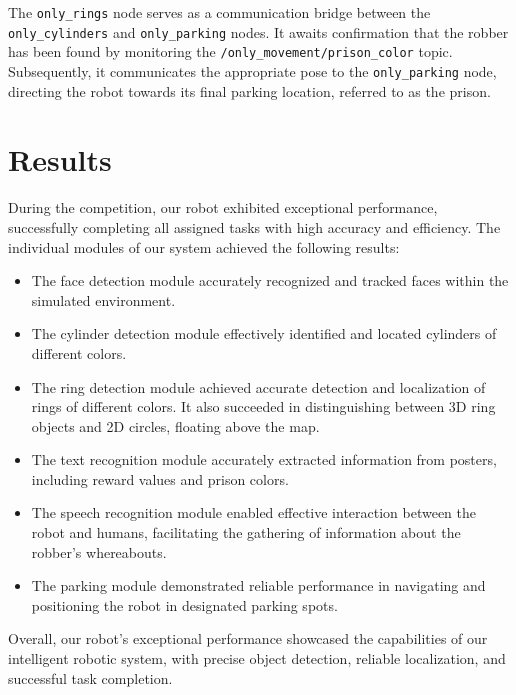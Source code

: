 \documentclass{article}
\begin{document}
The \texttt{only\_rings} node serves as a communication bridge between the \texttt{only\_cylinders} and \texttt{only\_parking} nodes. It awaits confirmation that the robber has been found by monitoring the \texttt{/only\_movement/prison\_color} topic. Subsequently, it communicates the appropriate pose to the \texttt{only\_parking} node, directing the robot towards its final parking location, referred to as the prison.

\section{Results}

During the competition, our robot exhibited exceptional performance, successfully completing all assigned tasks with high accuracy and efficiency. The individual modules of our system achieved the following results:
\begin{itemize}
  \item The face detection module accurately recognized and tracked faces within the simulated environment.
  \item The cylinder detection module effectively identified and located cylinders of different colors.
  \item The ring detection module achieved accurate detection and localization of rings of different colors. It also succeeded in distinguishing between 3D ring objects and 2D circles, floating above the map.
  \item The text recognition module accurately extracted information from posters, including reward values and prison colors.
  \item The speech recognition module enabled effective interaction between the robot and humans, facilitating the gathering of information about the robber's whereabouts.
  \item The parking module demonstrated reliable performance in navigating and positioning the robot in designated parking spots.
\end{itemize}
Overall, our robot's exceptional performance showcased the capabilities of our intelligent robotic system, with precise object detection, reliable localization, and successful task completion.
\end{document}
